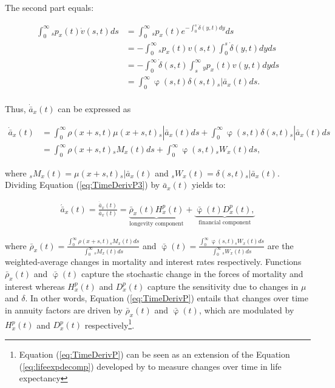 \documentclass[12pt]{article}
\begin{document}
The second part equals:

\begin{equation}\label{eq:TimeDerivP2}
\begin{split}
\int_0^\infty {}_sp_x(t) \dot{v}(s,t)ds &= \int_0^\infty {}_sp_x(t)  e^{-\int_0^{s}\dot{\delta}(y,t)dy}ds\\
&= -\int_0^\infty {}_sp_x(t) v(s,t) \int_0^{s}\dot{\delta}(y,t)dy ds\\
&= -\int_0^\infty  \dot{\delta}(s,t)\int_s^{\infty} {}_yp_x(t) v(y,t) dy ds\\
&= \int_0^\infty  \upvarphi(s,t) \delta(s,t)  {}_s|\bar{a}_x(t) ds.\\
\end{split}
\end{equation}


Thus, $\dot{\bar{a}} _x(t)$ can be expressed as


\begin{equation}\label{eq:TimeDerivP3}
\begin{split}
\dot{\bar{a}}_{x}(t) &=  \int_0^\infty \rho(x+s,t) \mu(x+s,t){}_s|\bar{a}_x(t) ds +\int_0^\infty  \upvarphi(s,t) \delta(s,t)  {}_s|\bar{a}_x(t) ds\\
&= \int_0^\infty \rho(x+s,t) {}_sM_x(t)  ds +\int_0^\infty  \upvarphi(s,t) {}_sW_x(t)  ds,
\end{split}
\end{equation}


where ${}_sM_x(t)= \mu(x+s,t){}_s|\bar{a}_x(t)$ and ${}_sW_x(t)=\delta(s,t)  {}_s|\bar{a}_x(t)$. Dividing Equation (\ref{eq:TimeDerivP3}) by $\bar{a}_x(t)$ yields to:


\begin{equation}\label{eq:TimeDerivP}
\begin{split}
 \acute{\bar{a}}_x(t) = \frac{\dot{\bar{a}}_x(t)}{\bar{a}_x(t)}  = 
 \underbrace{\bar{\rho}_x(t){H}^{p}_x(t)}_\text{longevity component}
 +\underbrace{\bar{\upvarphi}(t){D}^{p}_x(t),}_\text{financial component}
\end{split}
\end{equation}

where $\bar{\rho}_x(t)= \frac{\int_0^\infty \rho(x+s,t) {}_sM_x(t)  ds}{\int_0^\infty  {}_sM_x(t)ds}$ and 
$\bar{\upvarphi}(t)= \frac{\int_0^\infty \upvarphi(s,t) {}_sW_x(t)  ds}{\int_0^\infty {}_sW_x(t) ds}$ are the weighted-average changes in mortality and interest rates respectively. Functions $\bar{\rho}_x(t)$ and $\bar{\upvarphi}(t)$ capture the stochastic change in the forces of mortality and interest whereas ${H}^{p}_x(t)$ and ${D}^{p}_x(t)$ capture the sensitivity due to changes in $\mu$ and $\delta$. In other words, Equation (\ref{eq:TimeDerivP}) entails that changes over time in annuity factors are driven by $\bar{\rho}_x(t)$ and $\bar{\upvarphi}(t)$, which are modulated by ${H}^{p}_x(t)$ and ${D}^{p}_x(t)$ respectively\footnote{Equation (\ref{eq:TimeDerivP}) can be seen as an extension of the Equation (\ref{eq:lifeexpdecomp}) developed by \citet{Vaupel2003} to measure changes over time in life expectancy}.
\end{document}
